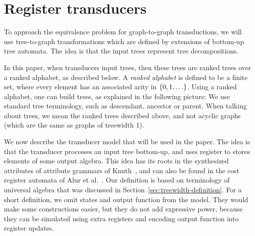\section{Register transducers}\label{sec:register-transducers}
To approach the equivalence problem for graph-to-graph transductions, we will use tree-to-graph transformations which are defined by extensions of bottom-up tree automata. The idea is that the input trees represent tree decompositions.

In this paper, when transducers input trees, then these trees are  ranked trees over a ranked alphabet, as described below. A \emph{ranked alphabet} is defined to be  a finite set, where every element has an associated arity in $\{0,1,\ldots\}$. Using a ranked alphabet, one can build trees, as explained in the following picture:
We use standard tree terminology, such as descendant, ancestor or parent. When talking about trees, we mean the ranked trees described above, and not acyclic graphs (which are the same as graphs of treewidth 1). 

We now describe the transducer model that will be used in the paper. The idea is that the transducer processes an input tree bottom-up, and uses register to stores elements of some output algebra.  This idea has its roots in the synthesized attributes of attribute grammars of Knuth~\cite{Knuth:1968aa}, and can also be found in the cost register automata of Alur et al.~\cite[p.~15]{alurDantoniDeshmukhYuan2013}. Our definition is based on  terminology of universal algebra that was discussed in Section~\ref{sec:treewidth-definition}.
For a short definition, we omit states and output function from the model. They would make some constructions easier, but they do not add expressive power, because they can be simulated using extra registers and encoding output function into register updates.

